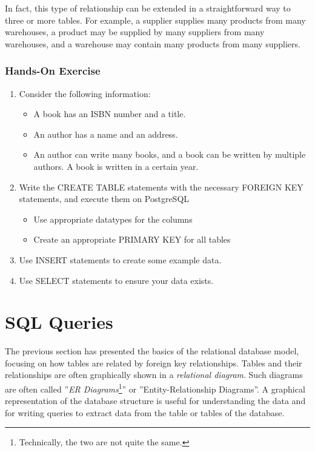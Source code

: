 In fact, this type of relationship can be extended in a straightforward way to three or more tables. For example, a supplier supplies many products from many warehouses, a product may be supplied by many suppliers from many warehouses, and a warehouse may contain many products from many suppliers. 

\begin{tcolorbox}[colback=code]
\subsubsection*{Hands-On Exercise}
\begin{enumerate}
  \item Consider the following information:
	\begin{itemize}
	  \item A book has an ISBN number and a title. 
	  \item An author has a name and an address. 
	  \item An author can write many books, and a book can be written by multiple authors. A book is written in a certain year.
	\end{itemize}
  \item Write the CREATE TABLE statements with the necessary FOREIGN KEY statements, and execute them on PostgreSQL
  \begin{itemize}
    \item Use appropriate datatypes for the columns
    \item Create an appropriate PRIMARY KEY for all tables
  \end{itemize}
  \item Use INSERT statements to create some example data.
  \item Use SELECT statements to ensure your data exists.
\end{enumerate}
\end{tcolorbox}

\section{SQL Queries}

The previous section has presented the basics of the relational database model, focusing on how tables are related by foreign key relationships. Tables and their relationships are often graphically shown in a \emph{relational diagram}. Such diagrams are often called ''\emph{ER Diagrams}\footnote{Technically, the two are not quite the same.}'' or ''Entity-Relationship Diagrams''. A graphical representation of the database structure is useful for understanding the data and for writing queries to extract data from the table or tables of the database. 

